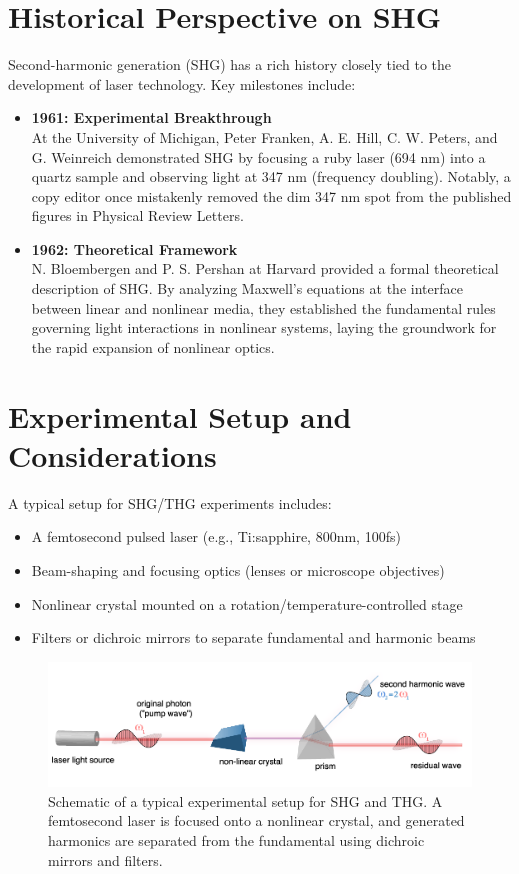 \documentclass[9pt,a4paper,twocolumn,twoside]{tau-class/tau}
\begin{document}
\section{Historical Perspective on SHG}
Second-harmonic generation (SHG) has a rich history closely tied to the development of laser technology. Key milestones include:

\begin{itemize}
    \item \textbf{1961: Experimental Breakthrough} \\
    At the University of Michigan, Peter Franken, A. E. Hill, C. W. Peters, and G. Weinreich demonstrated SHG by focusing a ruby laser (694 nm) into a quartz sample and observing light at 347 nm (frequency doubling). Notably, a copy editor once mistakenly removed the dim 347 nm spot from the published figures in Physical Review Letters.
    
    \item \textbf{1962: Theoretical Framework} \\
    N. Bloembergen and P. S. Pershan at Harvard provided a formal theoretical description of SHG. By analyzing Maxwell's equations at the interface between linear and nonlinear media, they established the fundamental rules governing light interactions in nonlinear systems, laying the groundwork for the rapid expansion of nonlinear optics.
\end{itemize}

\section{Experimental Setup and Considerations}
A typical setup for SHG/THG experiments includes:
\begin{itemize}
\item A femtosecond pulsed laser (e.g., Ti:sapphire, 800nm, 100fs)
\item Beam-shaping and focusing optics (lenses or microscope objectives)
\item Nonlinear crystal mounted on a rotation/temperature-controlled stage
\item Filters or dichroic mirrors to separate fundamental and harmonic beams
\end{itemize}

\begin{figure}[!ht] %
\centering
\includegraphics[width=0.95\columnwidth]{figures/experimental.png}
\caption{Schematic of a typical experimental setup for SHG and THG. A femtosecond laser is focused onto a nonlinear crystal, and generated harmonics are separated from the fundamental using dichroic mirrors and filters. \cite{JkwchuiImage}}
\end{figure}
\end{document}

